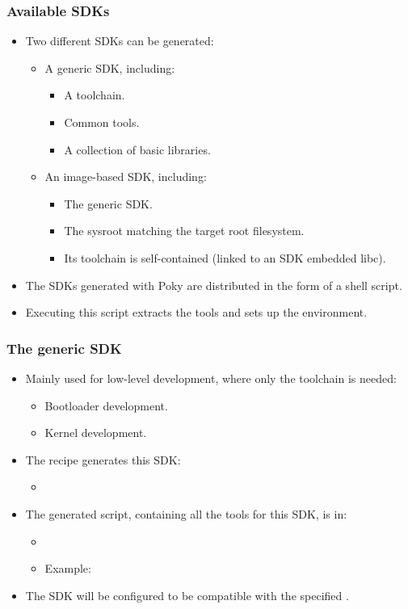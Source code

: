 \begin{frame}
  \frametitle{Available SDKs}
  \begin{itemize}
    \item Two different SDKs can be generated:
      \begin{itemize}
        \item A generic SDK, including:
          \begin{itemize}
            \item A toolchain.
            \item Common tools.
            \item A collection of basic libraries.
          \end{itemize}
        \item An image-based SDK, including:
          \begin{itemize}
            \item The generic SDK.
            \item The sysroot matching the target root filesystem.
            \item Its toolchain is self-contained (linked to an
              SDK embedded libc).
          \end{itemize}
      \end{itemize}
    \item The SDKs generated with Poky are distributed in the form of a
      shell script.
    \item Executing this script extracts the tools and sets up the
      environment.
  \end{itemize}
\end{frame}

\begin{frame}
  \frametitle{The generic SDK}
  \begin{itemize}
    \item Mainly used for low-level development, where only the
      toolchain is needed:
      \begin{itemize}
        \item Bootloader development.
        \item Kernel development.
      \end{itemize}
    \item The recipe  generates this SDK:
      \begin{itemize}
        \item {}
      \end{itemize}
    \item The generated script, containing all the tools for this SDK,
      is in:
      \begin{itemize}
        \item {}
        \item Example:
      \end{itemize}
    \item The SDK will be configured to be compatible with the
      specified .
  \end{itemize}
\end{frame}


